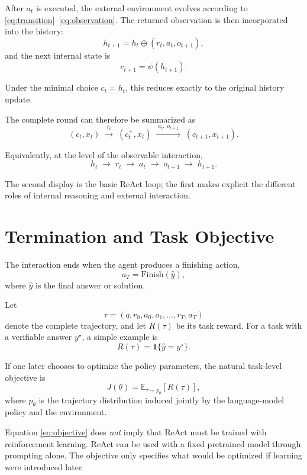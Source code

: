 \documentclass[11pt]{article}
\begin{document}
After \(a_t\) is executed, the external environment evolves according to \eqref{eq:transition}--\eqref{eq:observation}. The returned observation is then incorporated into the history:
\begin{equation}
    h_{t+1}
    =
    h_t\oplus(r_t,a_t,o_{t+1}),
    \label{eq:update}
\end{equation}
and the next internal state is
\begin{equation}
    c_{t+1}
    =
    \psi(h_{t+1}).
    \label{eq:next-internal-state}
\end{equation}

Under the minimal choice \(c_t=h_t\), this reduces exactly to the original history update.

The complete round can therefore be summarized as
\[
\boxed{
(c_t,x_t)
\;\xrightarrow{\;r_t\;}\;
(c_t^{+},x_t)
\;\xrightarrow{\;a_t,\;o_{t+1}\;}\;
(c_{t+1},x_{t+1}).
}
\]

Equivalently, at the level of the observable interaction,
\[
\boxed{
h_t
\;\longrightarrow\;
r_t
\;\longrightarrow\;
a_t
\;\longrightarrow\;
o_{t+1}
\;\longrightarrow\;
h_{t+1}.
}
\]

The second display is the basic ReAct loop; the first makes explicit the different roles of internal reasoning and external interaction.

\section{Termination and Task Objective}

The interaction ends when the agent produces a finishing action,
\[
a_T=\mathrm{Finish}(\hat y),
\]
where \(\hat y\) is the final answer or solution.

Let
\[
\tau
=
(q,r_0,a_0,o_1,\ldots,r_T,a_T)
\]
denote the complete trajectory, and let \(R(\tau)\) be its task reward. For a task with a verifiable answer \(y^\star\), a simple example is
\[
R(\tau)
=
\mathbf{1}\{\hat y=y^\star\}.
\]

If one later chooses to optimize the policy parameters, the natural task-level objective is
\begin{equation}
    J(\theta)
    =
    \mathbb{E}_{\tau\sim p_{\theta}}
    \left[
        R(\tau)
    \right],
    \label{eq:objective}
\end{equation}
where \(p_\theta\) is the trajectory distribution induced jointly by the language-model policy and the environment.

Equation \eqref{eq:objective} does \emph{not} imply that ReAct must be trained with reinforcement learning. ReAct can be used with a fixed pretrained model through prompting alone. The objective only specifies what would be optimized if learning were introduced later.
\end{document}
